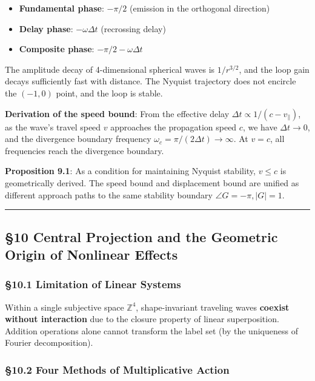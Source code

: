 \documentclass[
  a4paper,11pt]{article}
\providecommand{\tightlist}{%
  \setlength{\itemsep}{0pt}\setlength{\parskip}{0pt}}
\theoremstyle{definition}
\theoremstyle{remark}
\begin{document}
\begin{itemize}
\tightlist
\item
  \textbf{Fundamental phase}: \(-\pi/2\) (emission in the orthogonal
  direction)
\item
  \textbf{Delay phase}: \(-\omega \Delta t\) (recrossing delay)
\item
  \textbf{Composite phase}: \(-\pi/2 - \omega \Delta t\)
\end{itemize}

The amplitude decay of 4-dimensional spherical waves is \(1/r^{3/2}\),
and the loop gain decays sufficiently fast with distance. The Nyquist
trajectory does not encircle the \((-1, 0)\) point, and the loop is
stable.

\textbf{Derivation of the speed bound}: From the effective delay
\(\Delta t \propto 1/(c - v_\parallel)\), as the wave's travel speed
\(v\) approaches the propagation speed \(c\), we have
\(\Delta t \to 0\), and the divergence boundary frequency
\(\omega_c = \pi/(2\Delta t) \to \infty\). At \(v = c\), all frequencies
reach the divergence boundary.

\textbf{Proposition 9.1}: As a condition for maintaining Nyquist
stability, \(v \leq c\) is geometrically derived. The speed bound and
displacement bound are unified as different approach paths to the same
stability boundary \(\angle G = -\pi, |G| = 1\).

\begin{center}\rule{0.5\linewidth}{0.5pt}\end{center}

\subsection{§10 Central Projection and the Geometric Origin of Nonlinear
Effects}\label{central-projection-and-the-geometric-origin-of-nonlinear-effects}

\subsubsection{§10.1 Limitation of Linear
Systems}\label{limitation-of-linear-systems}

Within a single subjective space \(\mathbb{Z}^4\), shape-invariant
traveling waves \textbf{coexist without interaction} due to the closure
property of linear superposition. Addition operations alone cannot
transform the label set (by the uniqueness of Fourier decomposition).

\subsubsection{§10.2 Four Methods of Multiplicative
Action}\label{four-methods-of-multiplicative-action}
\end{document}
